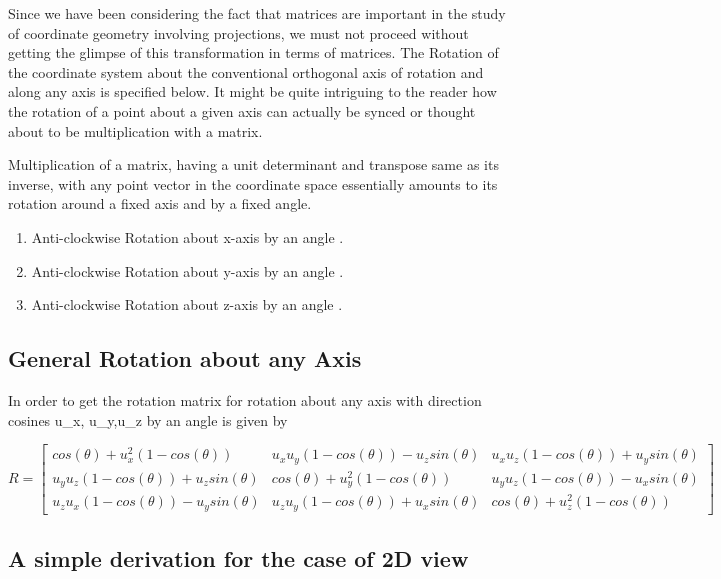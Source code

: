 \documentclass[12pt]{report}
\begin{document}
\hspace{1cm} Since we have been considering the fact that matrices are important in the study of coordinate geometry involving projections, we must not proceed without getting the glimpse of this transformation in terms of matrices. The Rotation of the coordinate system about the conventional orthogonal axis of rotation and along any axis is specified below.
\vspace{0.3cm}
It might be quite intriguing to the reader how the rotation of a point about a given axis can actually be synced or thought about to be multiplication with a matrix. 

\begin{lemma}
  Multiplication of a matrix, having a unit determinant and transpose same as its inverse, with any point vector in the coordinate space essentially amounts to its rotation around a fixed axis and by a fixed angle.
\end{lemma}

\begin{enumerate}
  \item Anti-clockwise Rotation about x-axis by an angle \theta.
  \item Anti-clockwise Rotation about y-axis by an angle \theta. 
  \item Anti-clockwise Rotation about z-axis by an angle \theta. 
\end{enumerate}

\subsection{General Rotation about any Axis}

In order to get the rotation matrix for rotation about any axis with direction cosines u_{x}, u_{y},u_{z} by an angle \theta is given by

\[ R =  \begin{bmatrix}
cos(\theta) + u_{x}^2(1-cos(\theta)) & u_{x}u_{y}(1-cos(\theta)) - u_{z}sin(\theta) &  u_{x}u_{z}(1-cos(\theta)) + u_{y}sin(\theta) \\
u_{y}u_{z}(1-cos(\theta)) + u_{z}sin(\theta) & cos(\theta) + u_{y}^2(1-cos(\theta)) &  u_{y}u_{z}(1-cos(\theta)) - u_{x}sin(\theta) \\
u_{z}u_{x}(1-cos(\theta)) - u_{y}sin(\theta) & u_{z}u_{y}(1-cos(\theta)) + u_{x}sin(\theta) & cos(\theta) + u_{z}^2(1-cos(\theta)) 
\end{bmatrix}\]

\subsection{A simple derivation for the case of 2D view}
\end{document}
